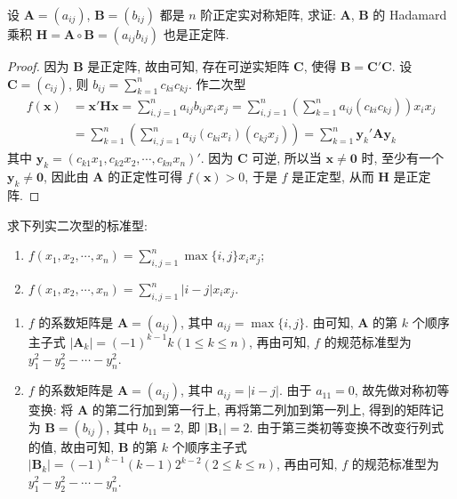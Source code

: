 \documentclass[../../main.tex]{subfiles}
\begin{document}
\begin{proposition}\label{proposition:正定实对称阵的Hadamard积也正定}
设 \(\boldsymbol{A}=(a_{ij})\), \(\boldsymbol{B}=(b_{ij})\) 都是 \(n\) 阶正定实对称矩阵, 求证: \(\boldsymbol{A}\), \(\boldsymbol{B}\) 的 Hadamard 乘积 \(\boldsymbol{H}=\boldsymbol{A}\circ\boldsymbol{B}=(a_{ij}b_{ij})\) 也是正定阵.
\end{proposition}
\begin{proof}
因为 \(\boldsymbol{B}\) 是正定阵, 故由可知, 存在可逆实矩阵 \(\boldsymbol{C}\), 使得 \(\boldsymbol{B}=\boldsymbol{C}'\boldsymbol{C}\). 设 \(\boldsymbol{C}=(c_{ij})\), 则 \(b_{ij}=\sum_{k = 1}^{n}c_{ki}c_{kj}\). 作二次型
\begin{align*}
f(\boldsymbol{x})&=\boldsymbol{x}'\boldsymbol{H}\boldsymbol{x}=\sum_{i,j = 1}^{n}a_{ij}b_{ij}x_ix_j=\sum_{i,j = 1}^{n}\left(\sum_{k = 1}^{n}a_{ij}(c_{ki}c_{kj})\right)x_ix_j\\
&=\sum_{k = 1}^{n}\left(\sum_{i,j = 1}^{n}a_{ij}(c_{ki}x_i)(c_{kj}x_j)\right)=\sum_{k = 1}^{n}\boldsymbol{y}_k'\boldsymbol{A}\boldsymbol{y}_k
\end{align*}
其中 \(\boldsymbol{y}_k=(c_{k1}x_1,c_{k2}x_2,\cdots,c_{kn}x_n)'\). 因为 \(\boldsymbol{C}\) 可逆, 所以当 \(\boldsymbol{x}\neq\boldsymbol{0}\) 时, 至少有一个 \(\boldsymbol{y}_k\neq\boldsymbol{0}\), 因此由 \(\boldsymbol{A}\) 的正定性可得 \(f(\boldsymbol{x})>0\), 于是 \(f\) 是正定型, 从而 \(\boldsymbol{H}\) 是正定阵.
\end{proof}

\begin{example}
求下列实二次型的标准型:
\begin{enumerate}
\item \(f(x_1,x_2,\cdots,x_n)=\sum_{i,j = 1}^{n}\max\{i,j\}x_ix_j\);
\item \(f(x_1,x_2,\cdots,x_n)=\sum_{i,j = 1}^{n}|i - j|x_ix_j\).
\end{enumerate}
\end{example}
\begin{solution}
\begin{enumerate}
\item \(f\) 的系数矩阵是 \(\boldsymbol{A}=(a_{ij})\), 其中 \(a_{ij}=\max\{i,j\}\). 由可知, \(\boldsymbol{A}\) 的第 \(k\) 个顺序主子式 \(|\boldsymbol{A}_k|=(-1)^{k - 1}k(1\leq k\leq n)\), 再由可知, \(f\) 的规范标准型为 \(y_1^2 - y_2^2 - \cdots - y_n^2\).
\item \(f\) 的系数矩阵是 \(\boldsymbol{A}=(a_{ij})\), 其中 \(a_{ij}=|i - j|\). 由于 \(a_{11}=0\), 故先做对称初等变换: 将 \(\boldsymbol{A}\) 的第二行加到第一行上, 再将第二列加到第一列上, 得到的矩阵记为 \(\boldsymbol{B}=(b_{ij})\), 其中 \(b_{11}=2\), 即 \(|\boldsymbol{B}_1| = 2\). 由于第三类初等变换不改变行列式的值, 故由可知, \(\boldsymbol{B}\) 的第 \(k\) 个顺序主子式 \(|\boldsymbol{B}_k|=(-1)^{k - 1}(k - 1)2^{k - 2}(2\leq k\leq n)\), 再由可知, \(f\) 的规范标准型为 \(y_1^2 - y_2^2 - \cdots - y_n^2\). 
\end{enumerate} 
\end{solution}
\end{document}
